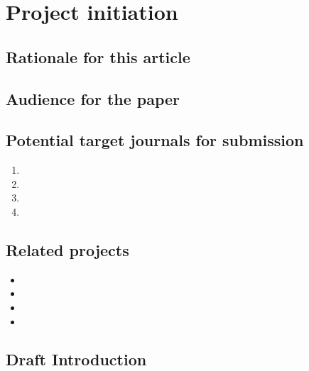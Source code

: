 \documentclass[11pt,letterpaper]{article}
\begin{document}
\section{Project initiation}
\label{sec:org6e1be76}


\subsection{Rationale for this article}
\label{sec:orgb79433f}

\subsection{Audience for the paper}
\label{sec:orgae86a03}



\subsection{Potential target journals for submission}
\label{sec:org4a8cea6}

\begin{enumerate}
\item 

\item 

\item 

\item 
\end{enumerate}




\subsection{Related projects}
\label{sec:org4fe45be}


\begin{itemize}
\item 

\item 

\item 

\item 
\end{itemize}

\subsection{Draft Introduction}
\label{sec:org2780afc}
\end{document}
